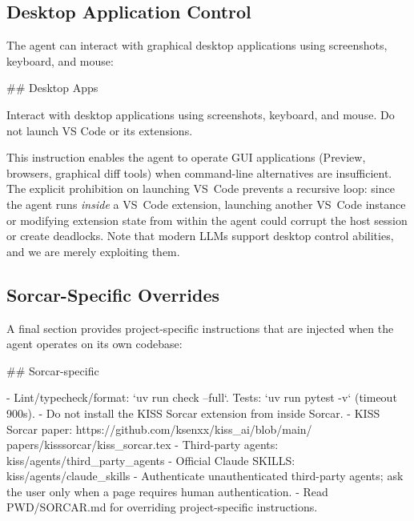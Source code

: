 \documentclass{article}
\begin{document}
\subsection{Desktop Application Control}

The agent can interact with graphical desktop applications using screenshots, keyboard, and mouse:

\begin{prompt}
## Desktop Apps

Interact with desktop applications using screenshots, keyboard, and mouse. Do not launch VS Code or its extensions.
\end{prompt}

\noindent This instruction enables the agent to operate GUI applications (Preview, browsers, graphical diff tools) when command-line alternatives are insufficient.  The explicit prohibition on launching VS~Code prevents a recursive loop: since the agent runs \emph{inside} a VS~Code extension, launching another VS~Code instance or modifying extension state from within the agent could corrupt the host session or create deadlocks.  Note that modern LLMs support desktop control abilities, and we are merely exploiting them.

\subsection{Sorcar-Specific Overrides}

A final section provides project-specific instructions that are injected when the agent operates on its own codebase:

\begin{prompt}
## Sorcar-specific

- Lint/typecheck/format: `uv run check --full`. Tests:
  `uv run pytest -v` (timeout 900s).
- Do not install the KISS Sorcar extension from inside
  Sorcar.
- KISS Sorcar paper:
  https://github.com/ksenxx/kiss_ai/blob/main/
    papers/kisssorcar/kiss_sorcar.tex
- Third-party agents: kiss/agents/third_party_agents
- Official Claude SKILLS: kiss/agents/claude_skills
- Authenticate unauthenticated third-party agents; ask
  the user only when a page requires human
  authentication.
- Read PWD/SORCAR.md for overriding project-specific
  instructions.
\end{prompt}
\end{document}
